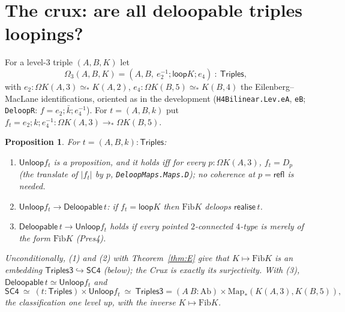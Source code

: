 \documentclass[11pt]{amsart}
\newtheorem{proposition}[theorem]{Proposition}
\theoremstyle{definition}
\theoremstyle{remark}
\newcommand{\Om}{\Omega}
\newcommand{\code}[1]{\texttt{#1}}
\newcommand{\refl}{\mathsf{refl}}
\newcommand{\Fib}{\mathrm{Fib}}
\newcommand{\Ab}{\mathrm{Ab}}
\newcommand{\SCf}{\mathsf{SC4}}
\newcommand{\Tri}{\mathsf{Triples}}
\newcommand{\Trit}{\mathsf{Triples3}}
\newcommand{\Del}{\mathsf{Deloopable}}
\newcommand{\Unloop}{\mathsf{Unloop}}
\newcommand{\real}{\mathsf{realise}}
\newcommand{\pteq}{\simeq_*}
\newcommand{\Map}{\mathrm{Map}_*}
\newcommand{\lp}{\mathsf{loop}}
\begin{document}
\section{The crux: are all deloopable triples loopings?}

For a level-$3$ triple $(A,B,K)$ let
\[
  \Om_3(A,B,K)=(A,B,\ e_2^{-1};\lp K;e_4)\ :\ \Tri,
\]
with $e_2:\Om K(A,3)\pteq K(A,2)$, $e_4:\Om K(B,5)\pteq K(B,4)$ the
Eilenberg--MacLane identifications, oriented as in the development
(\code{H4Bilinear.Lev.eA}, \code{eB}; \code{DeloopR}: $f=e_2;\bar k;e_4^{-1}$). For
$t=(A,B,k)$ put $f_t=e_2;k;e_4^{-1}:\Om K(A,3)\to_*\Om K(B,5)$.

\begin{proposition}\label{prop:crux}
For $t=(A,B,k):\Tri$:
\begin{enumerate}
\item $\Unloop f_t$ is a proposition, and it holds iff for every
  $p:\Om K(A,3)$, $f_t=D_p$ (the translate of $|f_t|$ by $p$,
  \code{DeloopMaps.Maps.D}); no coherence at $p=\refl$ is needed.
\item $\Unloop f_t\to\Del\,t$: if $f_t=\lp K$ then $\Fib K$ deloops $\real\,t$.
\item $\Del\,t\to\Unloop f_t$ holds if every pointed $2$-connected $4$-type is
  merely of the form $\Fib K$ (Pres4).
\end{enumerate}
Unconditionally, (1) and (2) with Theorem~\ref{thm:E} give that
$K\mapsto\Fib K$ is an embedding $\Trit\hookrightarrow\SCf$ (below); the Crux is
exactly its surjectivity. With (3), $\Del\,t\simeq\Unloop f_t$ and
\[
  \SCf\ \simeq\ (t:\Tri)\times\Unloop f_t\ \simeq\ \Trit
  =(A\ B:\Ab)\times\Map(K(A,3),K(B,5)),
\]
the classification one level up, with the inverse $K\mapsto\Fib K$.
\end{proposition}
\end{document}
